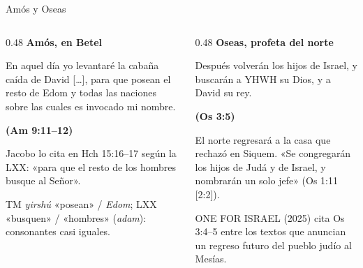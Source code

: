 \documentclass[hyperref={bookmarks=false},aspectratio=169]{beamer}
\newcommand{\fuente}[1]{\par\hfill{\upshape\bfseries\footnotesize\textcolor{ladrillo}{#1}}}
\begin{document}
\begin{frame}{Amós y Oseas}
\begin{columns}[T,onlytextwidth]
\begin{column}{0.48\textwidth}
\textbf{\textcolor{cafe}{Amós, en Betel}}
\begin{cita}[fontupper=\scriptsize\itshape]En aquel día yo levantaré la cabaña caída de David [\ldots], para que posean el resto de Edom y todas las naciones sobre las cuales es invocado mi nombre.\fuente{(Am 9:11--12)}\end{cita}
\footnotesize Jacobo lo cita en Hch 15:16--17 según la LXX: «para que el resto de los hombres busque al Señor».
\begin{notalam}[TM y LXX]
TM \emph{yirshú} «posean» / \emph{Edom}; LXX «busquen» / «hombres» (\emph{adam}): consonantes casi iguales.
\end{notalam}
\end{column}
\begin{column}{0.48\textwidth}
\textbf{\textcolor{cafe}{Oseas, profeta del norte}}
\begin{cita}[fontupper=\scriptsize\itshape]Después volverán los hijos de Israel, y buscarán a YHWH su Dios, y a David su rey.\fuente{(Os 3:5)}\end{cita}
\footnotesize El norte regresará a la casa que rechazó en Siquem. «Se congregarán los hijos de Judá y de Israel, y nombrarán un solo jefe» (Os 1:11 [2:2]).\par\smallskip
\begin{clave}ONE FOR ISRAEL (2025) cita Os 3:4--5 entre los textos que anuncian un regreso futuro del pueblo judío al Mesías.\end{clave}
\end{column}
\end{columns}
\end{frame}
\end{document}
